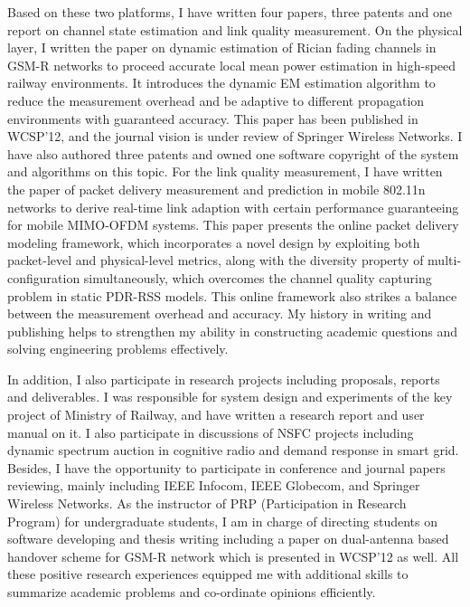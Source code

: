 \documentclass[journal,onecolumn]{IEEEtran}
\begin{document}
Based on these two platforms, I have written four papers, three patents and one report on channel state estimation and link quality measurement. On the physical layer, I written the paper on dynamic estimation of Rician fading channels in GSM-R networks to proceed accurate local mean power estimation in high-speed railway environments. It introduces the dynamic EM estimation algorithm to reduce the measurement overhead and be adaptive to different propagation environments with guaranteed accuracy. This paper has been published in WCSP'12, and the journal vision is under review of Springer Wireless Networks. I have also authored three patents and owned one software copyright of the system and algorithms on this topic. For the link quality measurement, I have written the paper of packet delivery measurement and prediction in mobile 802.11n networks to derive real-time link adaption with certain performance guaranteeing for mobile MIMO-OFDM systems. This paper presents the online packet delivery modeling framework, which incorporates a novel design by exploiting both packet-level and physical-level metrics, along with the diversity property of multi-configuration simultaneously, which overcomes the channel quality capturing problem in static PDR-RSS models. This online framework also strikes a balance between the measurement overhead and accuracy. My history in writing and publishing helps to strengthen my ability in constructing academic questions and solving engineering problems effectively.

In addition, I also participate in research projects including proposals, reports and deliverables. I was responsible for system design and experiments of the key project of Ministry of Railway, and have written a research report and user manual on it. I also participate in discussions of NSFC projects including dynamic spectrum auction in cognitive radio and demand response in smart grid. Besides, I have the opportunity to participate in conference and journal papers reviewing, mainly including IEEE Infocom, IEEE Globecom, and Springer Wireless Networks. As the instructor of PRP (Participation in Research Program) for undergraduate students, I am in charge of directing students on software developing and thesis writing including a paper on dual-antenna based handover scheme for GSM-R network which is presented in WCSP'12 as well. All these positive research experiences equipped me with additional skills to summarize academic problems and co-ordinate opinions efficiently.
\end{document}
